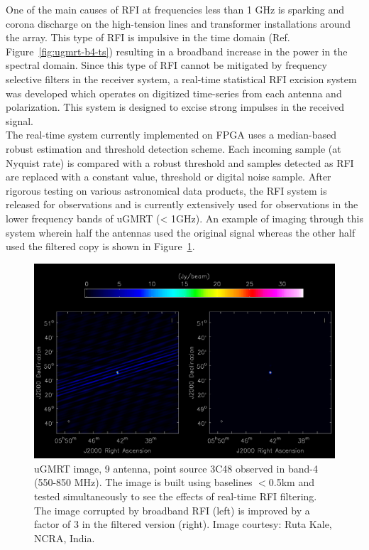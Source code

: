 \begin{itemize}
One of the main causes of RFI at frequencies less than 1 GHz is sparking and corona discharge on the high-tension lines and transformer installations around the array. This type of RFI is impulsive in the time domain (Ref. Figure~\ref{fig:ugmrt-b4-ts}) resulting in a broadband increase in the power in the spectral domain. Since this type of RFI cannot be mitigated by frequency selective filters in the receiver system, a real-time statistical RFI excision system was developed which operates on digitized time-series from each antenna and polarization. This system is designed to excise strong impulses in the received signal. \\

The real-time system currently implemented on FPGA \cite{buch2019real} uses a median-based robust estimation and threshold detection scheme. Each incoming sample (at Nyquist rate) is compared with a robust threshold and samples detected as RFI are replaced with a constant value, threshold or digital noise sample. After rigorous testing on various astronomical data products, the RFI system is released for observations and is currently extensively used for observations in the lower frequency bands of uGMRT (< 1GHz). An example of imaging through this system wherein half the antennas used the original signal whereas the other half used the filtered copy \cite{buch2022performance} is shown in Figure~\ref{fig:ugmrt-b4-image}. \\

\begin{figure}
    \includegraphics[scale=0.4]{Hardware Excision Techniques/figures/band4_point_source_rfi_filtering.png}
    \caption{uGMRT image, 9 antenna, point source 3C48 observed in band-4 (550-850 MHz). The image is built using baselines $<$0.5km and tested simultaneously to see the effects of real-time RFI filtering. The image corrupted by broadband RFI (left) is improved by a factor of 3 in the filtered version (right). Image courtesy: Ruta Kale, NCRA, India.
}
    \label{fig:ugmrt-b4-image}
\end{figure}


\end{itemize}
